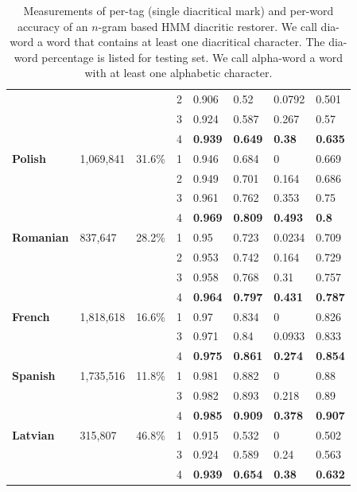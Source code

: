 \documentclass[12pt]{article}
\begin{document}
\begin{table}
\begin{tabular}{|l|l|l||l|l|l|l|l|}
            & & & 2 & 0.906 & 0.52 & 0.0792 & 0.501\\ \cline{4-8}
            & & & 3 & 0.924 & 0.587 & 0.267 & 0.57\\ \cline{4-8}
            & & & 4 & \textbf{0.939} & \textbf{0.649} & \textbf{0.38} & \textbf{0.635}\\ \cline{4-8}
            \hline
            \textbf{Polish} & 1,069,841 & 31.6\% & 1 & 0.946 & 0.684 & 0 & 0.669\\ \cline{4-8}
            & & & 2 & 0.949 & 0.701 & 0.164 & 0.686\\ \cline{4-8}
            & & & 3 & 0.961 & 0.762 & 0.353 & 0.75\\ \cline{4-8}
            & & & 4 & \textbf{0.969} & \textbf{0.809} & \textbf{0.493} & \textbf{0.8}\\ \cline{4-8}
            \hline
            \textbf{Romanian} & 837,647 & 28.2\% & 1 & 0.95 & 0.723 & 0.0234 & 0.709\\ \cline{4-8}
            & & & 2 & 0.953 & 0.742 & 0.164 & 0.729\\ \cline{4-8}
            & & & 3 & 0.958 & 0.768 & 0.31 & 0.757\\ \cline{4-8}
            & & & 4 & \textbf{0.964} & \textbf{0.797} & \textbf{0.431} & \textbf{0.787}\\ \cline{4-8}
            \hline
            \textbf{French} & 1,818,618 & 16.6\% & 1 & 0.97 & 0.834 & 0 & 0.826\\ \cline{4-8}
            & & & 3 & 0.971 & 0.84 & 0.0933 & 0.833\\ \cline{4-8}
            & & & 4 & \textbf{0.975} & \textbf{0.861} & \textbf{0.274} & \textbf{0.854}\\ \cline{4-8}
            \hline
            \textbf{Spanish} & 1,735,516 & 11.8\% & 1 & 0.981 & 0.882 & 0 & 0.88\\ \cline{4-8}
            & & & 3 & 0.982 & 0.893 & 0.218 & 0.89\\ \cline{4-8}
            & & & 4 & \textbf{0.985} & \textbf{0.909} & \textbf{0.378} & \textbf{0.907}\\ \cline{4-8}
            \hline
            \textbf{Latvian} & 315,807 & 46.8\% & 1 & 0.915 & 0.532 & 0 & 0.502\\ \cline{4-8}
            & & & 3 & 0.924 & 0.589 & 0.24 & 0.563\\ \cline{4-8}
            & & & 4 & \textbf{0.939} & \textbf{0.654} & \textbf{0.38} & \textbf{0.632}\\ \cline{4-8}
            \hline
        \end{tabular}
        \caption{Measurements of per-tag (single diacritical mark) and per-word accuracy
        of an $n$-gram based HMM diacritic restorer.
        We call dia-word a word that contains at least one diacritical character.
        The dia-word percentage is listed for testing set.
        We call alpha-word a word with at least one alphabetic character.
        } \label{tab:measures}
    \end{table}
\end{document}
